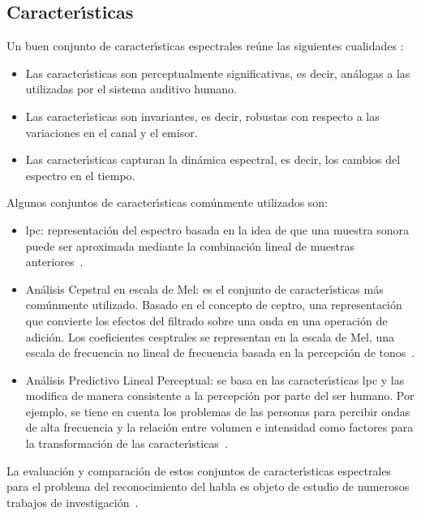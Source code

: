 \subsection{Caracter{\'\i}sticas}
Un buen conjunto de caracter{\'\i}sticas espectrales re\'une las siguientes cualidades \cite{KesarkarFeature2003}:
\begin{itemize}
\item Las caracter{\'\i}sticas son perceptualmente significativas, es decir, an\'alogas a las utilizadas 
por el sistema auditivo humano.
\item Las caracter{\'\i}sticas son invariantes, es decir, robustas con respecto a las variaciones en el canal 
y el emisor.
\item Las caracter{\'\i}sticas capturan la din\'amica espectral, es decir, los cambios del espectro en el tiempo.
\end{itemize}

\vspace*{1\baselineskip}
Algunos conjuntos de caracter{\'\i}sticas com\'unmente utilizados son:
\begin{itemize}
\item \gls{lpc}: representaci\'on del espectro basada en la idea de que una muestra 
sonora puede ser aproximada mediante la combinaci\'on lineal de muestras \mbox{anteriores \cite{KesarkarFeature2003}}.
\item An\'alisis Cepstral en escala de Mel: es el conjunto de caracter{\'\i}sticas m\'as com\'unmente utilizado. 
Basado en el concepto de ceptro, una representaci\'on que convierte los efectos del filtrado sobre una onda en una 
operaci\'on de adici\'on. Los coeficientes cesptrales se representan en la escala de Mel, una escala de frecuencia no
lineal de frecuencia basada en la percepci\'on de \mbox{tonos \cite{Ellis08anintroduction}}.
\item An\'alisis Predictivo Lineal Perceptual: se basa en las caracter{\'\i}sticas \gls{lpc} y las modifica de manera 
consistente a la percepci\'on por parte del ser humano. Por ejemplo, se tiene en cuenta los problemas de las personas 
para percibir ondas de alta frecuencia y la relaci\'on entre volumen e intensidad como factores para la 
transformaci\'on de las \mbox{caracter{\'\i}sticas \cite{Jurafsky}}. 
\end{itemize}

La evaluaci\'on y comparaci\'on de estos conjuntos de caracter{\'\i}sticas espectrales para el problema
del reconocimiento del habla es objeto de estudio de numerosos trabajos de
\mbox{investigaci\'on \cite{DorraComparative2006, SarosiComparison2011, ElminirEvaluation2012}}.


